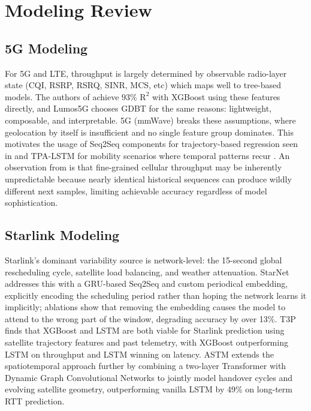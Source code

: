 \documentclass[12pt]{article}
\begin{document}
\section{Modeling Review}

\subsection{5G Modeling}

For 5G and LTE, throughput is largely determined by observable radio-layer state (CQI, RSRP, RSRQ, SINR, MCS, etc) which maps well to tree-based models. The authors of \cite{minovski2021throughput} achieve $93\% \text{ R}^2$ with XGBoost using these features directly, and Lumos5G \cite{lumos5g} chooses GDBT for the same reasons: lightweight, composable, and interpretable. 5G (mmWave) breaks these assumptions, where geolocation by itself is insufficient and no single feature group dominates. This motivates the usage of Seq2Seq components for trajectory-based regression seen in \cite{lumos5g} and TPA-LSTM for mobility scenarios where temporal patterns recur \cite{MEI2022108736}. An observation from \cite{10723472} is that fine-grained cellular throughput may be inherently unpredictable because nearly identical historical sequences can produce wildly different next samples, limiting achievable accuracy regardless of model sophistication.

\subsection{Starlink Modeling}

Starlink's dominant variability source is network-level: the 15-second global rescheduling cycle, satellite load balancing, and weather attenuation. StarNet \cite{liu2025vivisecting} addresses this with a GRU-based Seq2Seq and custom periodical embedding, explicitly encoding the scheduling period rather than hoping the network learns it implicitly; ablations show that removing the embedding causes the model to attend to the wrong part of the window, degrading accuracy by over 13\%. T3P \cite{tiwari_t3p_2023} finds that XGBoost and LSTM are both viable for Starlink prediction using satellite trajectory features and past telemetry, with XGBoost outperforming LSTM on throughput and LSTM winning on latency. ASTM \cite{Tian2025attentionbased} extends the spatiotemporal approach further by combining a two-layer Transformer with Dynamic Graph Convolutional Networks to jointly model handover cycles and evolving satellite geometry, outperforming vanilla LSTM by 49\% on long-term RTT prediction.
\end{document}
